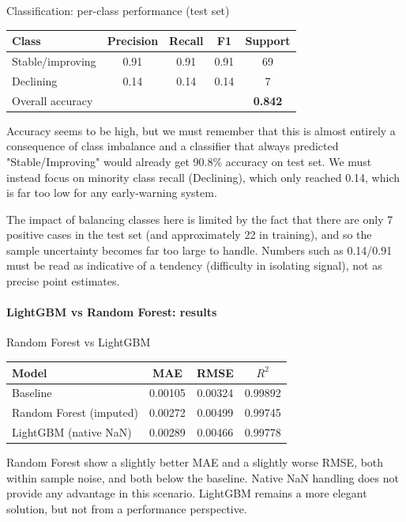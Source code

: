 \begin{center}
Classification: per-class performance (test set)
\vspace{4pt}

\begin{tabular}{lcccc}
\toprule
Class & Precision & Recall & F1 & Support \\
\midrule
Stable/improving & 0.91 & 0.91 & 0.91 & 69 \\
Declining          & 0.14 & 0.14 & 0.14 & 7 \\
\midrule
\multicolumn{4}{l}{Overall accuracy} & \textbf{0.842} \\
\bottomrule
\end{tabular}
\end{center}
Accuracy seems to be high, but we must remember that this is almost entirely a consequence of class imbalance and a classifier that always predicted "Stable/Improving" would already get 90.8\% accuracy on test set. We must instead focus on minority class recall (Declining), which only reached 0.14, which is far too low for any early-warning system.

The impact of balancing classes here is limited by the fact that there are only 7 positive cases in the test set (and approximately 22 in training), and so the sample uncertainty becomes far too large to handle. Numbers such as 0.14/0.91 must be read as indicative of a tendency (difficulty in isolating signal), not as precise point estimates.

\paragraph{LightGBM vs Random Forest: results}

\begin{center}
Random Forest vs LightGBM
\vspace{4pt}

\begin{tabular}{lccc}
\toprule
Model & MAE & RMSE & $R^2$ \\
\midrule
Baseline                 & 0.00105 & 0.00324 & 0.99892 \\
Random Forest (imputed)  & 0.00272 & 0.00499 & 0.99745 \\
LightGBM (native NaN)    & 0.00289 & 0.00466 & 0.99778 \\
\bottomrule
\end{tabular}
\label{tab:light-vs-RF}
\end{center}
Random Forest show a slightly better MAE and a slightly worse RMSE, both within sample noise, and both below the baseline. Native NaN handling does not provide any advantage in this scenario. LightGBM remains a more elegant solution, but not from a performance perspective.

